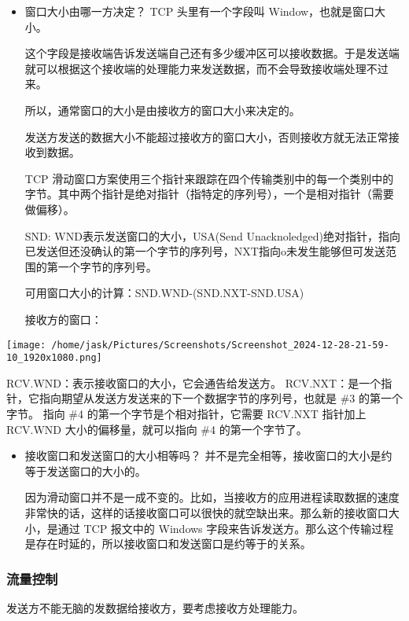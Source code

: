 \documentclass[11pt]{article}
\begin{document}
\begin{itemize}
\item 窗口大小由哪一方决定？
TCP 头里有一个字段叫 Window，也就是窗口大小。

这个字段是接收端告诉发送端自己还有多少缓冲区可以接收数据。于是发送端就可以根据这个接收端的处理能力来发送数据，而不会导致接收端处理不过来。

所以，通常窗口的大小是由接收方的窗口大小来决定的。

发送方发送的数据大小不能超过接收方的窗口大小，否则接收方就无法正常接收到数据。

TCP 滑动窗口方案使用三个指针来跟踪在四个传输类别中的每一个类别中的字节。其中两个指针是绝对指针（指特定的序列号），一个是相对指针（需要做偏移）。

SND: WND表示发送窗口的大小，USA(Send Unacknoledged)绝对指针，指向已发送但还没确认的第一个字节的序列号，NXT指向o未发生能够但可发送范围的第一个字节的序列号。

可用窗口大小的计算：SND.WND-(SND.NXT-SND.USA)

接收方的窗口：
\end{itemize}

\begin{center}
\texttt{[image: /home/jask/Pictures/Screenshots/Screenshot\_2024-12-28-21-59-10\_1920x1080.png]}
\end{center}
   RCV.WND：表示接收窗口的大小，它会通告给发送方。
   RCV.NXT：是一个指针，它指向期望从发送方发送来的下一个数据字节的序列号，也就是 \#3 的第一个字节。
   指向 \#4 的第一个字节是个相对指针，它需要 RCV.NXT 指针加上 RCV.WND 大小的偏移量，就可以指向 \#4 的第一个字节了。

\begin{itemize}
\item 接收窗口和发送窗口的大小相等吗？
并不是完全相等，接收窗口的大小是约等于发送窗口的大小的。

因为滑动窗口并不是一成不变的。比如，当接收方的应用进程读取数据的速度非常快的话，这样的话接收窗口可以很快的就空缺出来。那么新的接收窗口大小，是通过 TCP 报文中的 Windows 字段来告诉发送方。那么这个传输过程是存在时延的，所以接收窗口和发送窗口是约等于的关系。
\end{itemize}
\subsubsection{流量控制}
\label{sec:orgb0b46b3}

发送方不能无脑的发数据给接收方，要考虑接收方处理能力。
\end{document}

